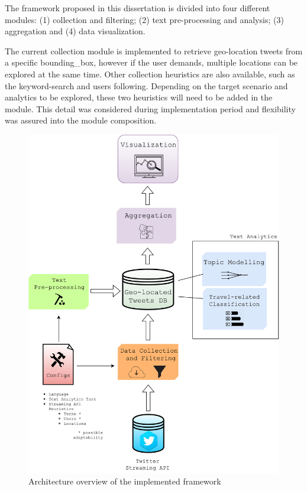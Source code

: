 The framework proposed in this dissertation is divided into four different modules: (1) collection and filtering; (2) text pre-processing and analysis; (3) aggregation and (4) data visualization.

The current collection module is implemented to retrieve geo-location tweets from a specific \gls{bounding_box}, however if the user demands, multiple locations can be explored at the same time. Other collection heuristics are also available, such as the keyword-search and users following. Depending on the target scenario and analytics to be explored, these two heuristics will need to be added in the module. This detail was considered during implementation period and flexibility was assured into the module composition.

\begin{figure}[!ht]
	\centering
	\includegraphics[width=\textwidth]{figures/architecture_2.pdf}
	\caption[Framework Architecture Overview]{Architecture overview of the implemented framework}
	\label{fig:architecture}
\end{figure}


